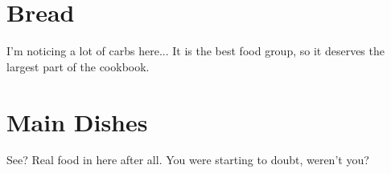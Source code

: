 \documentclass[%
a4paper,
11pt
]{article}
\begin{document}









\section{Bread}
I'm noticing a lot of carbs here...  It is the best food group, so it deserves the largest part of the cookbook.
















\section{Main Dishes}
See?  Real food in here after all.  You were starting to doubt, weren't you?










\end{document}
